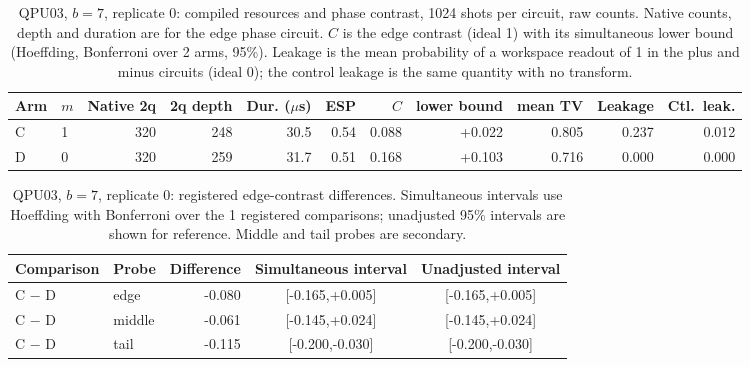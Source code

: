 \begin{table}[htbp]\centering\scriptsize\setlength{\tabcolsep}{3pt}
\caption{QPU03, $b=7$, replicate 0: compiled resources and phase contrast, 1024 shots per circuit, raw counts. Native counts, depth and duration are for the edge phase circuit. $C$ is the edge contrast (ideal 1) with its simultaneous lower bound (Hoeffding, Bonferroni over 2 arms, 95\%). Leakage is the mean probability of a workspace readout of 1 in the plus and minus circuits (ideal 0); the control leakage is the same quantity with no transform.}\label{tab:q3-b7r0}
\begin{tabular}{llrrrrrrrrr}\toprule Arm & $m$ & Native 2q & 2q depth & Dur. ($\mu$s) & ESP & $C$ & lower bound & mean TV & Leakage & Ctl.\ leak.\\\midrule
C & 1 & 320 & 248 & 30.5 & 0.54 & 0.088 & +0.022 & 0.805 & 0.237 & 0.012\\
D & 0 & 320 & 259 & 31.7 & 0.51 & 0.168 & +0.103 & 0.716 & 0.000 & 0.000\\
\bottomrule\end{tabular}\end{table}

\begin{table}[htbp]\centering\scriptsize\setlength{\tabcolsep}{3pt}
\caption{QPU03, $b=7$, replicate 0: registered edge-contrast differences. Simultaneous intervals use Hoeffding with Bonferroni over the 1 registered comparisons; unadjusted 95\% intervals are shown for reference. Middle and tail probes are secondary.}\label{tab:q3d-b7r0}
\begin{tabular}{llrcc}\toprule Comparison & Probe & Difference & Simultaneous interval & Unadjusted interval\\\midrule
C $-$ D & edge & -0.080 & [-0.165,+0.005] & [-0.165,+0.005]\\
C $-$ D & middle & -0.061 & [-0.145,+0.024] & [-0.145,+0.024]\\
C $-$ D & tail & -0.115 & [-0.200,-0.030] & [-0.200,-0.030]\\
\bottomrule\end{tabular}\end{table}

